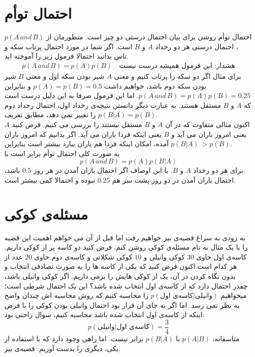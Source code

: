 \section{احتمال توأم}
احتمال توأم  روشی برای بیان احتمال درستی دو چیز است. منظورمان از $p(A \,and\, B)$، احتمال درستی هر دو رخداد $A$ و $B$ است. اگر شما در مورد احتمال پرتاب سکه و تاس بدانید احتمالا فرمول زیر را آموخته اید.
\begin{align*}
 p(A \,and\, B) = p(A)p(B) \quad \text{هشدار: این فرمول همیشه درست نیست}
\end{align*}
برای مثال اگر دو سکه را پرتاب کنیم و معنی $A$ شیر بودن سکه اول و معنی $B$ شیر بودن سکه دوم باشد، خواهیم داشت $p(A) = p(B) = 0.5$ و بنابراین $p(A \,and\, B) = p(A)p(B) = 0.25$. اما این فرمول صرفا به این دلیل درست است که $A$ و $B$ مستقل هستند. به عبارت دیگر دانستن نتیجه‌ی رخداد اول، احتمال رخداد دوم را تغییر نمی دهد، مطابق تعریف $p(B|A) = p(B)$.\\
اکنون مثالی متفاوت که در  آن $A$ و $B$ مستقل نیستند را بررسی می کنیم. فرض کنید $A$ یعنی امروز باران می آید و $B$ یعنی اینکه فردا باران می آید. اگر بدانیم که امروز باران آمده، امکان اینکه فردا هم باران ببارد بیشتر است بنابراین $p(B|A) \ > p(B)$.\\
به صورت کلی احتمال توأم برابر است با
$$ p(A \,and\, B) = p(A)p(B|A) $$
برای هر دو رخداد $A$ و $B$. با این اوصاف اگر احتمال باران آمدن در هر روز $0.5$ باشد، احتمال باران آمدن در دو روز پشت سر هم $0.25$ نبوده و احتمالا کمی بیشتر است.
\section{مسئله‌ی کوکی}
به زودی به سراغ قضیه‌ی بیز خواهیم رفت اما قبل از آن می خواهم اهمیت این قضیه را با یک مثال به نام مسئله‌ی کوکی روشن کنم. فرض کنید دو کاسه پر از کوکی داریم. کاسه‌ی اول حاوی $30$ کوکی وانیلی و $10$ کوکی شکلاتی و کاسه‌ی دوم حاوی $20$ عدد از هر کدام است.اکنون فرض کنید که یکی از کاسه ها را به صورت تصادفی انتخاب و بدون نگاه کردن در آن، یک از کوکی هایش را برمی داریم. اگر کوکی وانیلی باشد، چقدر احتمال دارد که از کاسه‌ی اول انتخاب شده باشد؟ این یک احتمال شرطی است؛ میخواهیم \(  p(\text{کاسه‌ی اول}|\text{وانیلی}) \) را محاسبه کنیم که روش محاسبه اش چندان واضح به نظر نمی رسد. اما اگر به جای آن قرار بود احتمال وانیلی بودن کوکی را با فرض اینکه از کاسه‌ی اول انتخاب شده باشد محاسبه کنیم، سوال راحتی بود:
\[  p(\text{وانیلی}|\text{کاسه‌ی اول}) = \frac{3}{4} \]
متاسفانه، $p(A|B)$ با $p(B|A)$ برابر نیست. اما راهی وجود دارد که با استفاده از یکی، دیگری را بدست آوریم: قضیه‌ی بیز.
